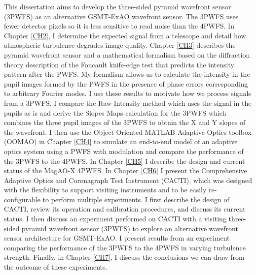 This dissertation aims to develop the three-sided pyramid wavefront sensor (3PWFS) as an alternative GSMT-ExAO wavefront sensor. The 3PWFS  uses fewer detector pixels so it is less sensitive to read noise than the 4PWFS. In Chapter \ref{CH2}, I determine the expected signal from a telescope and detail how atmospheric turbulence degrades image quality. Chapter \ref{CH3} describes the pyramid wavefront sensor and a mathematical formalism based on the diffraction theory description of the Foucault knife-edge test that predicts the intensity pattern after the PWFS. My formalism allows us to calculate the intensity in the pupil images formed by the PWFS in the presence of phase errors corresponding to arbitrary Fourier modes. I use these results to motivate how we process signals from a 3PWFS. I compare the Raw Intensity method which uses the signal in the pupils as is and derive the Slopes Maps calculation for the 3PWFS which combines the three pupil images of the 3PWFS to obtain the X and Y slopes of the wavefront. I then use the Object Oriented MATLAB Adaptive Optics toolbox (OOMAO) in Chapter \ref{CH4} to simulate an end-to-end model of an adaptive optics system using a PWFS with modulation and compare the performance of the 3PWFS to the 4PWFS. In Chapter \ref{CH5} I describe the design and current status of the MagAO-X 4PWFS. In Chapter \ref{CH6} I present the Comprehensive Adaptive Optics and Coronagraph Test Instrument (CACTI), which was designed with the flexibility to support visiting instruments and to be easily re-configurable to perform multiple experiments. I first describe the design of CACTI, review its operation and calibration procedures, and discuss its current status. I then discuss an experiment performed on CACTI with a visiting three-sided pyramid wavefront sensor (3PWFS) to explore an alternative wavefront sensor architecture for GSMT-ExAO. I present results from an experiment comparing the performance of the 3PWFS to the 4PWFS in varying turbulence strength. Finally, in Chapter \ref{CH7}, I discuss the conclusions we can draw from the outcome of these experiments.












%  
%



